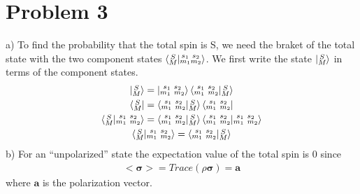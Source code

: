 \documentclass[a4paper,12pt]{article}
\numberwithin{equation}{section}
\newcommand{\bv}[1]{\mathbf{#1}}
\begin{document}
\section{Problem 3}
a) To find the probability that the total spin is S, we need the braket of the total state with the two component states 
$\braket{\substack{S\\M}|\substack{s_1\\m_1}\substack{s_2\\m_2}}$. 
We first write the state $\ket{\substack{S\\M}}$ in terms of the component states.
\begin{gather}
 \ket{\substack{S\\M}}=\ket{\substack{s_1\ s_2\\m_1\ m_2}}\braket{\substack{s_1\ s_2\\m_1\ m_2}|\substack{S\\M}}\\
 \bra{\substack{S\\M}}=\braket{\substack{s_1\ s_2\\m_1\ m_2}|\substack{S\\M}}\bra{\substack{s_1\ s_2\\m_1\ m_2}}\\
 \braket{\substack{S\\M}|\substack{s_1\ s_2\\m_1 \ m_2}}=
     \braket{\substack{s_1\ s_2\\m_1\ m_2}|\substack{S\\M}}\braket{\substack{s_1\ s_2\\m_1\ m_2}|\substack{s_1\ s_2\\m_1\ m_2}}\\
 \braket{\substack{S\\M}|\substack{s_1\ s_2\\m_1 \ m_2}}=
     \braket{\substack{s_1\ s_2\\m_1\ m_2}|\substack{S\\M}}    
\end{gather}
b) For an ``unpolarized'' state the expectation value of the total spin is 0 since
\begin{gather}
 <\bv{\sigma}>=Trace(\rho \bv{\sigma} )=\bv{a}
\end{gather}
where $\bv{a}$ is the polarization vector.
\end{document}
